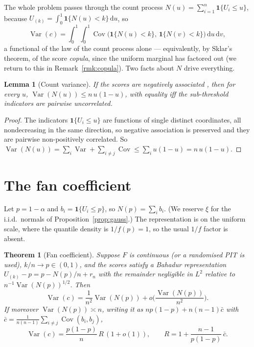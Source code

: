\documentclass[11pt]{article}
\newtheorem{theorem}{Theorem}
\newtheorem{lemma}{Lemma}
\begin{document}
The whole problem passes through the count process $N(u)=\sum_{i=1}^n\mathbf 1\{U_i\le u\}$, because
$U_{(k)}=\int_0^1\mathbf 1\{N(u)<k\}\,\mathrm du$, so
\begin{equation}
\operatorname{Var}(c)=\int_0^1\!\!\int_0^1\operatorname{Cov}\big(\mathbf 1\{N(u)<k\},\,
\mathbf 1\{N(v)<k\}\big)\,\mathrm du\,\mathrm dv,
\end{equation}
a functional of the law of the count process alone --- equivalently, by Sklar's theorem, of the score
\emph{copula}, since the uniform marginal has factored out (we return to this in
Remark~\ref{rmk:copula}). Two facts about $N$ drive everything.

\begin{lemma}[Count variance]\label{lem:count}
If the scores are negatively associated \citep{joagdev1983}, then for every $u$,
$\operatorname{Var}(N(u))\le n\,u(1-u)$, with equality iff the sub-threshold indicators are pairwise
uncorrelated.
\end{lemma}
\begin{proof}
The indicators $\mathbf 1\{U_i\le u\}$ are functions of single distinct coordinates, all nondecreasing
in the same direction, so negative association is preserved and they are pairwise non-positively
correlated. So
$\operatorname{Var}(N(u))=\sum_i\operatorname{Var}+\sum_{i\ne j}\operatorname{Cov}\le
\sum_i u(1-u)=n\,u(1-u)$.
\end{proof}

\section{The fan coefficient}

Let $p=1-\alpha$ and $b_i=\mathbf 1\{U_i\le p\}$, so $N(p)=\sum_i b_i$. (We reserve $\xi$ for the
i.i.d.\ normals of Proposition~\ref{prop:gauss}.) The representation is on the uniform scale, where the
quantile density is $1/f(p)=1$, so the usual $1/f$ factor is absent.

\begin{theorem}[Fan coefficient]\label{thm:coeff}
Suppose $F$ is continuous (or a randomised PIT is used), $k/n\to p\in(0,1)$, and the scores satisfy a
Bahadur representation $U_{(k)}-p=p-N(p)/n+r_n$ with the remainder negligible in $L^2$ relative to
$n^{-1}\operatorname{Var}(N(p))^{1/2}$. Then
\begin{equation}
\operatorname{Var}(c)=\frac1{n^2}\operatorname{Var}(N(p))+o\!\Big(\frac{\operatorname{Var}(N(p))}{n^2}\Big).
\end{equation}
If moreover $\operatorname{Var}(N(p))\asymp n$, writing it as
$np(1-p)+n(n-1)\bar c$ with $\bar c=\tfrac1{n(n-1)}\sum_{i\ne j}\operatorname{Cov}(b_i,b_j)$,
\begin{equation}
\operatorname{Var}(c)=\frac{p(1-p)}{n}\,R\,(1+o(1)),\qquad R=1+\frac{n-1}{p(1-p)}\,\bar c .
\end{equation}
\end{theorem}
\end{document}
